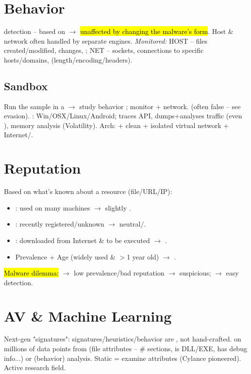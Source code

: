 \section{Behavior}
 detection -- based on  $\to$ \hl{unaffected by changing the malware's form}. Host \& network often handled by separate engines.
\textit{Monitored:} HOST -- files created/modified,  changes, ; NET -- sockets, connections to specific hosts/domains,  (length/encoding/headers).

\subsection{Sandbox}
Run the sample in a  $\to$ study behavior ; monitor  + network.  (often false -- see evasion). : Win/OSX/Linux/Android; traces API, dumps+analyses traffic (even ), memory analysis (Volatility). Arch:  + clean  + isolated virtual network + Internet/.

\section{Reputation}
Based on what's known about a resource (file/URL/IP):
\begin{itemize}
\item {}: used on many machines $\to$ slightly .
\item {}: recently registered/unknown $\to$ neutral/.
\item {}: downloaded from Internet \& to be executed $\to$ .
\item Prevalence + Age (widely used \& $>$1 year old) $\to$ .
\end{itemize}
\hl{Malware dilemma:}  $\to$ low prevalence/bad reputation $\to$ suspicious;  $\to$ easy  detection.

\section{AV \& Machine Learning}
Next-gen "signatures": signatures/heuristics/behavior are , not hand-crafted.  on millions of data points from  (file attributes -- \# sections, is DLL/EXE, has debug info...) or  (behavior) analysis. Static = examine attributes  (Cylance pioneered). Active research field.

